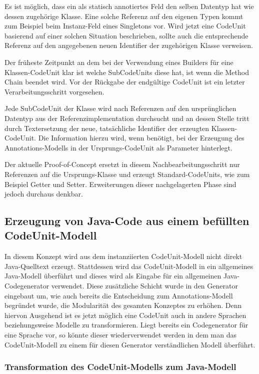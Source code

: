 \documentclass[12pt,oneside,a4paper,parskip]{scrbook}
\begin{document}
Es ist möglich, dass ein als statisch annotiertes Feld den selben Datentyp hat wie dessen zugehörige Klasse. Eine solche Referenz auf den eigenen Typen kommt zum Beispiel beim Instanz-Feld eines Singletons vor. Wird jetzt eine CodeUnit basierend auf einer solchen Situation beschrieben, sollte auch die entsprechende Referenz auf den angegebenen neuen Identifier der zugehörigen Klasse verweisen.

Der früheste Zeitpunkt an dem bei der Verwendung eines Builders für eine Klassen-CodeUnit klar ist welche SubCodeUnits diese hat, ist wenn die Method Chain beendet wird. Vor der Rückgabe der endgültige CodeUnit ist ein letzter Verarbeitungsschritt vorgesehen. 

Jede SubCodeUnit der Klasse wird nach Referenzen auf den ursprünglichen Datentyp aus der Referenzimplementation durchsucht und an dessen Stelle tritt durch Textersetzung der neue, tatsächliche Identifier der erzeugten Klassen-CodeUnit. Die Information hierzu wird, wenn benötigt, bei der Erzeugung des Annotations-Modells in der Ursprungs-CodeUnit als Parameter hinterlegt.

Der aktuelle Proof-of-Concept ersetzt in diesem Nachbearbeitungsschritt nur Referenzen auf die Ursprungs-Klasse und erzeugt Standard-CodeUnits, wie zum Beispiel Getter und Setter. Erweiterungen dieser nachgelagerten Phase sind jedoch durchaus denkbar.

\subsection{Erzeugung von Java-Code aus einem befüllten CodeUnit-Modell}

In diesem Konzept wird aus dem instanziierten CodeUnit-Modell nicht direkt Java-Quelltext erzeugt. Stattdessen wird das CodeUnit-Modell in ein allgemeines Java-Modell überführt und dieses wird als Eingabe für ein allgemeinen Java-Codegenerator verwendet. Diese zusätzliche Schicht wurde in den Generator eingebaut um, wie auch bereits die Entscheidung zum Annotations-Modell begründet wurde, die Modularität des gesamten Konzeptes zu erhöhen. Denn hiervon Ausgehend ist es jetzt möglich eine CodeUnit auch in andere Sprachen beziehungsweise Modelle zu transformieren. Liegt bereits ein Codegenerator für eine Sprache vor, so könnte dieser wiederverwendet werden in dem man das CodeUnit-Modell zu einem für diesen Generator verständlichen Modell überführt.

\subsubsection{Transformation des CodeUnit-Modells zum Java-Modell}
\end{document}

